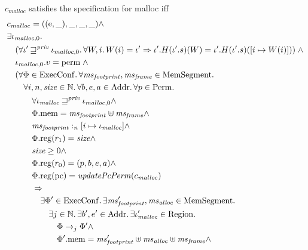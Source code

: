 \documentclass[a4paper]{article}
\newcommand{\var}[1]{\mathit{#1}}
\newcommand{\hs}{\var{ms}}
\newcommand{\ms}{\hs}
\newcommand{\pcreg}{\mathrm{pc}}
\newcommand{\heap}{\var{mem}}
\newcommand{\plainproj}[1]{\mathrm{#1}}
\newcommand{\memheap}[1][\Phi]{#1.\plainproj{mem}}
\newcommand{\memreg}[1][\Phi]{#1.\plainproj{reg}}
\newcommand{\plainfun}[2]{
  \ifthenelse{\equal{#2}{}}
  {\mathit{#1}}
  {\mathit{#1}(#2)}
}
\newcommand{\updatePcPerm}[1]{\plainfun{updatePcPerm}{#1}}
\newcommand{\futurestr}{\mathbin{\sqsupseteq}^{\var{priv}}}
\newcommand{\heapSat}[3][\heap]{#1 :_{#2} #3}
\newcommand{\codelabel}[1]{\mathit{#1}}
\newcommand{\malloc}{\codelabel{malloc}}
\newcommand{\plaindom}[1]{\mathrm{#1}}
\newcommand{\Addrs}{\plaindom{Addr}}
\newcommand{\ExecConfs}{\plaindom{ExecConf}}
\newcommand{\HeapSegments}{\plaindom{MemSegment}}
\newcommand{\nats}{\mathbb{N}}
\newcommand{\Perms}{\plaindom{Perm}}
\newcommand{\Regions}{\plaindom{Region}}
\newcommand{\plainperm}[1]{\mathrm{#1}}
\newcommand{\entry}{\plainperm{e}}
\newcommand{\plainview}[1]{\mathrm{#1}}
\newcommand{\perma}{\plainview{perm}}
\newcommand{\step}[1][]{\rightarrow_{#1}}
\begin{document}
              \begin{specification}[Malloc v.2]
                $c_\malloc$ satisfies the specification for malloc iff
                \[  
                  \begin{aligned}
                    &c_\malloc = ((\entry,\_),\_,\_,\_) \land\\
                    &\exists \iota_{\malloc,0} \ldotp \\
                    &\quad (\forall \iota' \futurestr \iota_{\malloc,0} \ldotp \forall W,i \ldotp W(i)=\iota' \Rightarrow \iota'.H (\iota'.s) (W) = \iota'.H (\iota'.s) ([i \mapsto W(i)]) ) \; \land \\
                    &\quad \iota_{\malloc,0}.v = \perma \; \land \\
                    &\quad (\forall \Phi \in \ExecConfs \ldotp \forall \ms_{\var{footprint}}, \hsframe \in \HeapSegments \ldotp \\
                    &\qquad \forall i, n, \size \in \nats \ldotp \forall b,e,a \in \Addrs\ldotp\forall p \in \Perms \ldotp \\
                    &\qquad \quad \forall \iota_\malloc \futurestr \iota_{\malloc,0} \land \\
                    &\qquad \quad \memheap = \ms_{\var{footprint}} \uplus \hsframe \land\\
                    &\qquad \quad \heapSat[\ms_{\var{footprint}}]{n}{[i \mapsto \iota_\malloc]} \land \\
                    &\qquad \quad \memreg(r_1) = \size \land \\
                    &\qquad \quad \size \geq 0 \land \\
                    &\qquad \quad \memreg(r_0) = (p,b,e,a) \land \\
                    &\qquad \quad \memreg(\pcreg) = \updatePcPerm{c_\malloc} \\ %
                    &\qquad \quad \Rightarrow \\
                    &\qquad \qquad\exists \Phi' \in \ExecConfs \ldotp \exists \ms_{\var{footprint}}', \ms_{\var{alloc}} \in \HeapSegments\ldotp\\
                    &\qquad \qquad \quad \exists j \in \nats \ldotp \exists b',e'\in \Addrs \ldotp \exists \iota_\malloc' \in \Regions \ldotp \\
                    &\qquad \qquad \qquad \Phi \step[j] \Phi' \land \\
                    &\qquad \qquad \qquad \memheap[\Phi']=\ms_{\var{footprint}}' \uplus \hs_{\var{alloc}} \uplus \hsframe \land\\

\end{aligned}\]
\end{specification}
\end{document}
